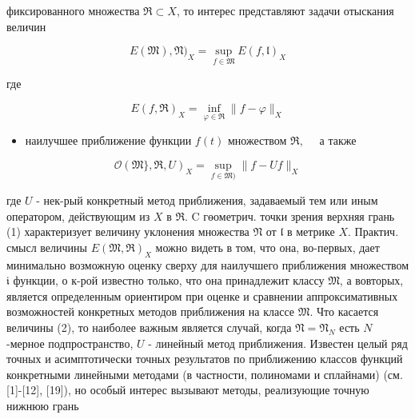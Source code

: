 \documentclass[10pt]{article}
\begin{document}
фиксированного множества $\mathfrak{R} \subset X$, то интерес представляют задачи отыскания величин



\[

E(\mathfrak{M}), \mathfrak{N})_{X}=\sup _{f \in \mathfrak{M}} E(f, \mathfrak{l})_{X}

\]



где



\[

E(f, \mathfrak{\Re})_{X}=\inf _{\varphi \in \mathfrak{R}}\|f-\varphi\|_{X}

\]



\begin{itemize}

  \item наилучшее приближение функции $f(t)$ множеством $\mathfrak{\Re}, \quad$ а также

\end{itemize}



\[

\mathscr{O}(\mathfrak{M}\}, \mathfrak{R}, U)_{X}=\sup _{f \in \mathfrak{M})}\|f-U f\|_{X}

\]



где $U$ - нек-рый конкретный метод приближения, задаваемый тем или иным оператором, действующим из $X$ в $\mathfrak{R}$. C гөометрич. точки зрения верхняя грань (1) характеризует величину уклонения множества $\mathfrak{N}$ от $\mathfrak{l}$ в метрике $X$. Практич. смысл величины $E(\mathfrak{M}, \mathfrak{R})_{X}$ можно видеть в том, что она, во-первых, дает минимально возможную оценку сверху для наилучшего приближения множеством $\mathfrak{i}$ функции, о к-рой известно только, что она принадлежит классу $\mathfrak{M}$, а вовторых, является определенным ориентиром при оценке и сравнении аппроксимативных возможностей конкретных методов приближения на классе $\mathfrak{M}$. Что касается величины (2), то наиболее важным является случай, когда $\mathfrak{N}=\mathfrak{N}_{N}$ есть $N$-мерное подпространство, $U$ - линейный метод приближения. Известен целый ряд точных и асимптотически точных результатов по приближению классов функций конкретными линейными методами (в частности, полиномами и сплайнами) (см. [1]-[12], [19]), но особый интерес вызывают методы, реализующие точную нижнюю грань
\end{document}
